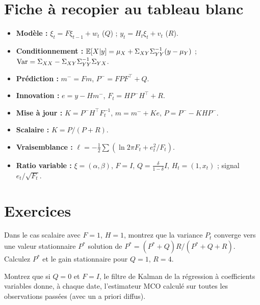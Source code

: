 \section{Fiche à recopier au tableau blanc}

\begin{whiteboard}
\begin{itemize}[leftmargin=1.2em]
\item \textbf{Modèle :} $\xi_t = F\xi_{t-1} + w_t$ ($Q$) ; $y_t = H_t\xi_t + v_t$ ($R$).
\item \textbf{Conditionnement :} $\mathbb{E}[X|y] = \mu_X + \Sigma_{XY}\Sigma_{YY}^{-1}(y-\mu_Y)$ ; $\operatorname{Var} = \Sigma_{XX} - \Sigma_{XY}\Sigma_{YY}^{-1}\Sigma_{YX}$.
\item \textbf{Prédiction :} $m^- = Fm$, $P^- = FPF^\top + Q$.
\item \textbf{Innovation :} $e = y - Hm^-$, $F_t = HP^-H^\top + R$.
\item \textbf{Mise à jour :} $K = P^-H^\top F_t^{-1}$, $m = m^- + Ke$, $P = P^- - KHP^-$.
\item \textbf{Scalaire :} $K = P/(P+R)$.
\item \textbf{Vraisemblance :} $\ell = -\frac12\sum(\ln 2\pi F_t + e_t^2/F_t)$.
\item \textbf{Ratio variable :} $\xi = (\alpha,\beta)$, $F = I$, $Q = \frac\delta{1-\delta}I$, $H_t = (1,x_t)$ ; signal $e_t/\sqrt{F_t}$.
\end{itemize}
\end{whiteboard}

\section{Exercices}

\begin{exercise}
Dans le cas scalaire avec $F = 1$, $H = 1$, montrez que la variance $P_t$ converge vers une valeur stationnaire $P^\ast$ solution de $P^\ast = (P^\ast+Q)R/(P^\ast+Q+R)$. Calculez $P^\ast$ et le gain stationnaire pour $Q = 1$, $R = 4$.
\end{exercise}

\begin{exercise}
Montrez que si $Q = 0$ et $F = I$, le filtre de Kalman de la régression à coefficients variables donne, à chaque date, l'estimateur MCO calculé sur toutes les observations passées (avec un a priori diffus).
\end{exercise}

